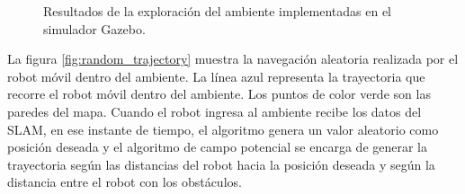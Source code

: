 \begin{figure}[ht!]
     \begin{center}
    \end{center}
  \captionsetup{font=footnotesize}
    \caption{\label{fig:Gazebo_explora}Resultados de la exploración del ambiente implementadas en el simulador Gazebo.}
\end{figure} 

La figura \ref{fig:random_trajectory} muestra la navegación aleatoria realizada por el 
robot móvil dentro del ambiente. La línea azul representa la trayectoria que recorre el robot 
móvil dentro del ambiente. Los puntos de color verde son las paredes del mapa. Cuando el robot 
ingresa al ambiente recibe los datos del SLAM, en ese instante de tiempo, el algoritmo genera 
un valor aleatorio como posición deseada y el algoritmo de campo potencial se encarga de 
generar la trayectoria según las distancias del robot hacia la posición deseada y según la 
distancia entre el robot con los obstáculos.




